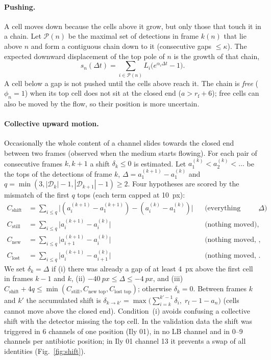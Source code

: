 \documentclass[11pt,a4paper]{article}
\newcommand{\rf}{r_{\mathrm{f}}}     %
\begin{document}
\paragraph{Pushing.} A cell moves down because the cells above it grow, but only those that touch it in a chain. Let $\mathcal P(n)$ be the maximal set of detections in frame $k(n)$ that lie above $n$ and form a contiguous chain down to it (consecutive gaps $\le\kappa$). The expected downward displacement of the top pole of $n$ is the growth of that chain,
\begin{equation}
s_n(\Delta t)=\sum_{i\in\mathcal P(n)}L_i\bigl(e^{\alpha_i\Delta t}-1\bigr).
\end{equation}
A cell below a gap is not pushed until the cells above reach it. The chain is \emph{free} ($\phi_n=1$) when its top cell does not sit at the closed end ($a>\rf+6$); free cells can also be moved by the flow, so their position is more uncertain.

\paragraph{Collective upward motion.} Occasionally the whole content of a channel slides towards the closed end between two frames (observed when the medium starts flowing). For each pair of consecutive frames $k,k+1$ a shift $\delta_k\le0$ is estimated. Let $a^{(k)}_1<a^{(k)}_2<\dots$ be the tops of the detections of frame $k$, $\Delta=a^{(k+1)}_1-a^{(k)}_1$ and $q=\min(3,|\mathcal D_k|-1,|\mathcal D_{k+1}|-1)\ge2$. Four hypotheses are scored by the mismatch of the first $q$ tops (each term capped at \SI{10}{px}):
\begin{align*}
C_{\text{shift}}&=\textstyle\sum_{i\le q}\bigl|(a^{(k+1)}_i-a^{(k+1)}_1)-(a^{(k)}_i-a^{(k)}_1)\bigr| && \text{(everything moved by $\Delta$)},\\
C_{\text{still}}&=\textstyle\sum_{i\le q}\bigl|a^{(k+1)}_i-a^{(k)}_i\bigr| && \text{(nothing moved)},\\
C_{\text{new top}}&=\textstyle\sum_{i\le q}\bigl|a^{(k+1)}_{i+1}-a^{(k)}_i\bigr| && \text{(nothing moved, a new box above)},\\
C_{\text{lost top}}&=\textstyle\sum_{i\le q}\bigl|a^{(k+1)}_i-a^{(k)}_{i+1}\bigr| && \text{(nothing moved, the top box was lost)}.
\end{align*}
We set $\delta_k=\Delta$ if (i) there was already a gap of at least \SI{4}{px} above the first cell in frames $k-1$ and $k$, (ii) $\SI{-40}{px}\le\Delta\le\SI{-4}{px}$, and (iii) $C_{\text{shift}}+4q\le\min(C_{\text{still}},C_{\text{new top}},C_{\text{lost top}})$; otherwise $\delta_k=0$. Between frames $k$ and $k'$ the accumulated shift is $\delta_{k\to k'}=\max\bigl(\sum_{i=k}^{k'-1}\delta_i,\;\rf-1-a_n\bigr)$ (cells cannot move above the closed end). Condition~(i) avoids confusing a collective shift with the detector missing the top cell. In the validation data the shift was triggered in 6 channels of one position (Ily 01), in no LB channel and in 0--9 channels per antibiotic position; in Ily 01 channel 13 it prevents a swap of all identities (Fig.~\ref{fig:shift}).
\end{document}
